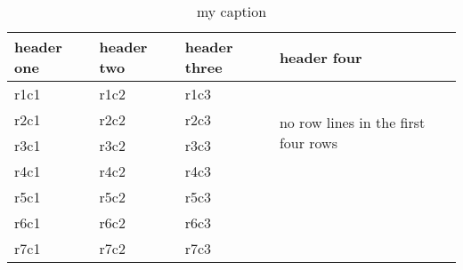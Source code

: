 \documentclass{article}
\begin{document}
\begin{table}[h!]
	\centering
	\caption{my caption}
	\label{tab:test}
	\begin{tabular}{  l  l  l  l }
		\toprule
		\textbf{header one} & \textbf{header two} & \textbf{header three} & \textbf{header four}                                  \\ \midrule
		r1c1                & r1c2                & r1c3                  & \multirow{4}{*}{ no row lines in the first four rows} \\ \cmidrule{1-3}
		r2c1                & r2c2                & r2c3                  &                                                       \\ \cmidrule{1-3}
		r3c1                & r3c2                & r3c3                  &                                                       \\\cmidrule{1-3}
		r4c1                & r4c2                & r4c3                  &                                                       \\ \midrule
		r5c1                & r5c2                & r5c3                  &                                                       \\ \midrule
		r6c1                & r6c2                & r6c3                  &                                                       \\ \midrule
		r7c1                & r7c2                & r7c3                  &                                                       \\ \bottomrule
	\end{tabular}
\end{table}
\end{document}
